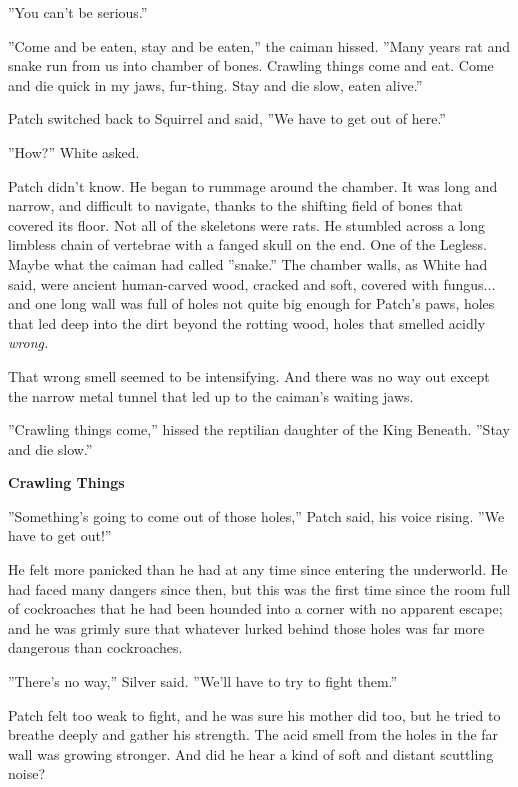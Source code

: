 \documentclass[11pt]{article}
\begin{document}
 ''You can't be serious.''\par
 ''Come and be eaten, stay and be eaten,'' the caiman hissed. ''Many years rat and snake run from us into chamber of bones. Crawling things come and eat. Come and die quick in my jaws, fur-thing. Stay and die slow, eaten alive.''\par
 Patch switched back to Squirrel and said, ''We have to get out of here.''\par
 ''How?'' White asked.\par
 Patch didn't know. He began to rummage around the chamber. It was long and narrow, and difficult to navigate, thanks to the shifting field of bones that covered its floor. Not all of the skeletons were rats. He stumbled across a long limbless chain of vertebrae with a fanged skull on the end. One of the Legless. Maybe what the caiman had called ''snake.'' The chamber walls, as White had said, were ancient human-carved wood, cracked and soft, covered with fungus... and one long wall was full of holes not quite big enough for Patch's paws, holes that led deep into the dirt beyond the rotting wood, holes that smelled acidly {\it wrong.} \par
That wrong smell seemed to be intensifying. And there was no way out except the narrow metal tunnel that led up to the caiman's waiting jaws.\par
 ''Crawling things come,'' hissed the reptilian daughter of the King Beneath. ''Stay and die slow.''\par
\par
{\bf Crawling Things\par
}\par
 ''Something's going to come out of those holes,'' Patch said, his voice rising. ''We have to get out!''\par
 He felt more panicked than he had at any time since entering the underworld. He had faced many dangers since then, but this was the first time since the room full of cockroaches that he had been hounded into a corner with no apparent escape; and he was grimly sure that whatever lurked behind those holes was far more dangerous than cockroaches.\par
 ''There's no way,'' Silver said. ''We'll have to try to fight them.''\par
 Patch felt too weak to fight, and he was sure his mother did too, but he tried to breathe deeply and gather his strength. The acid smell from the holes in the far wall was growing stronger. And did he hear a kind of soft and distant scuttling noise?\par
\end{document}
